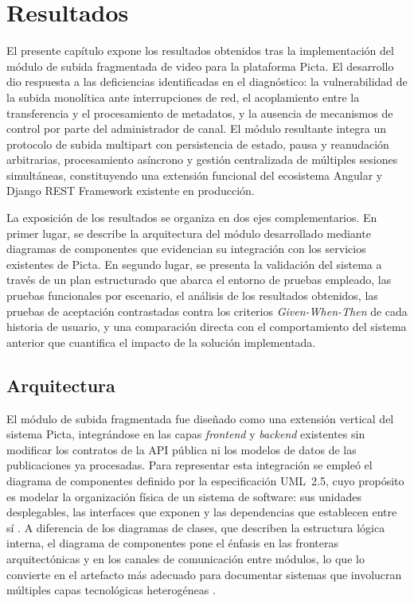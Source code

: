\chapter{Resultados}
\label{chap:chapter3}

El presente capítulo expone los resultados obtenidos tras la implementación del módulo de subida
fragmentada de video para la plataforma Picta. El desarrollo dio respuesta a las deficiencias
identificadas en el diagnóstico: la vulnerabilidad de la subida monolítica ante interrupciones de
red, el acoplamiento entre la transferencia y el procesamiento de metadatos, y la ausencia de
mecanismos de control por parte del administrador de canal. El módulo resultante integra un
protocolo de subida multipart con persistencia de estado, pausa y reanudación arbitrarias,
procesamiento asíncrono y gestión centralizada de múltiples sesiones simultáneas,
constituyendo una extensión funcional del ecosistema Angular y Django REST Framework existente en
producción.
 
La exposición de los resultados se organiza en dos ejes complementarios. En primer lugar, se
describe la arquitectura del módulo desarrollado mediante diagramas de componentes que evidencian
su integración con los servicios existentes de Picta. En segundo lugar, se presenta la validación
del sistema a través de un plan estructurado que abarca el entorno de pruebas empleado, las pruebas
funcionales por escenario, el análisis de los resultados obtenidos, las pruebas de aceptación
contrastadas contra los criterios \textit{Given-When-Then} de cada historia de usuario, y una
comparación directa con el comportamiento del sistema anterior que cuantifica el impacto de la
solución implementada.

\section{Arquitectura}
\label{sec:arquitectura}

El módulo de subida fragmentada fue diseñado como una extensión vertical del sistema Picta,
integrándose en las capas \textit{frontend} y \textit{backend} existentes sin modificar los
contratos de la API pública ni los modelos de datos de las publicaciones ya procesadas. Para
representar esta integración se empleó el diagrama de componentes definido por la especificación
UML~2.5, cuyo propósito es modelar la organización física de un sistema de software: sus unidades
desplegables, las interfaces que exponen y las dependencias que establecen entre sí
\citep{OMG2017,Booch2005}. A diferencia de los diagramas de clases, que describen la estructura
lógica interna, el diagrama de componentes pone el énfasis en las fronteras arquitectónicas y en los
canales de comunicación entre módulos, lo que lo convierte en el artefacto más adecuado para
documentar sistemas que involucran múltiples capas tecnológicas heterogéneas \citep{Larman2004}.

